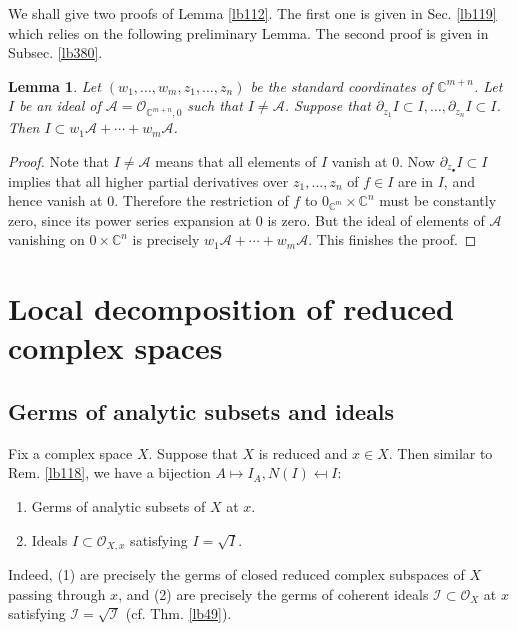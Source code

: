 \documentclass[12pt,b5paper,notitlepage]{report}
\theoremstyle{definition}
\theoremstyle{plain}
\newtheorem{lm}[df]{Lemma}
\newcommand{\mc}{\mathcal}
\newcommand{\scr}{\mathscr}
\newcommand{\blt}{\bullet}
\newcommand{\Cbb}{\mathbb C}
\numberwithin{equation}{section}
\begin{document}
We shall give two proofs of Lemma \ref{lb112}. The first one is given in Sec. \ref{lb119} which relies on the following preliminary Lemma. The second proof is given in Subsec. \ref{lb380}.



\begin{lm}\label{lb111}
Let $(w_1,\dots,w_m,z_1,\dots,z_n)$ be the standard coordinates of $\Cbb^{m+n}$. Let $I$ be an ideal of $\scr A=\scr O_{\Cbb^{m+n},0}$ such that $I\neq\scr A$. Suppose that $\partial_{z_1}I\subset I,\dots,\partial_{z_n}I\subset I$. Then $I\subset w_1\scr A+\cdots+w_m\scr A$.
\end{lm}


\begin{proof}
Note that $I\neq\scr A$ means that all elements of $I$ vanish at $0$. Now $\partial_{z_\blt}I\subset I$ implies that all higher partial derivatives over $z_1,\dots,z_n$ of $f\in I$ are in $I$, and hence vanish at $0$. Therefore the restriction of $f$ to $0_{\Cbb^m}\times\Cbb^n$ must be constantly zero, since its power series expansion at $0$ is zero. But the ideal of elements of $\scr A$ vanishing on $0\times\Cbb^n$ is precisely $w_1\scr A+\cdots+w_m\scr A$. This finishes the proof.
\end{proof}



\section{Local decomposition of reduced complex spaces}


\subsection{Germs of analytic subsets and ideals}\label{lb157}


Fix a complex space $X$. Suppose that $X$ is reduced and $x\in X$. Then similar to Rem. \ref{lb118}, we have a bijection $A\mapsto I_A,N(I)\mapsfrom I$:
\begin{enumerate}[label=(\arabic*)]
\item Germs of analytic subsets of $X$ at $x$.
\item Ideals $I\subset\scr O_{X,x}$ satisfying $I=\sqrt I$.
\end{enumerate}
Indeed, (1) are precisely the germs of closed reduced complex subspaces of $X$ passing through $x$, and (2) are precisely the germs of coherent ideals $\mc I\subset\scr O_X$ at $x$ satisfying $\mc I=\sqrt{\mc I}$ (cf. Thm. \ref{lb49}). 
\end{document}
